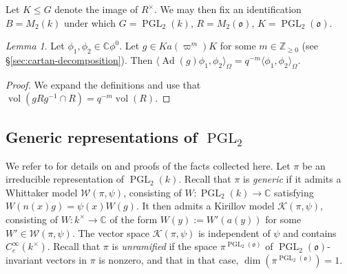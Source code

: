 \documentclass[reqno,10pt]{amsart}
\theoremstyle{plain} %
\theoremstyle{definition}
\theoremstyle{plain} %
\theoremstyle{remark}
\theoremstyle{itplain} %
\newtheorem{lemma}{Lemma}
\theoremstyle{remark} %
\renewcommand{\geq}{\geqslant}
\renewcommand{\leq}{\leqslant}
\numberwithin{equation}{section}
\DeclareMathOperator{\Ad}{Ad}
\def\PGL{\operatorname{PGL}}
\DeclareMathOperator{\vol}{vol}
\begin{document}
Let $K \leq G$ denote the image of $R^\times$.  We may then fix an identification $B = M_2(k)$ under which $G = \PGL_2(k)$, $R = M_2(\mathfrak{o})$, $K = \PGL_2(\mathfrak{o})$.
\begin{lemma}\label{lem:formula-for-how-Ad-acts-on-distinguish-element-inner-products}
  Let $\phi_1, \phi_2 \in \mathbb{C} \phi^0$.  Let $g \in K a(\varpi^m) K$ for some $m \in \mathbb{Z}_{\geq 0}$ (see \S\ref{sec:cartan-decomposition}).  Then $\langle \Ad(g) \phi_1, \phi_2 \rangle_{\Omega} = q^{-m} \langle \phi_1, \phi_2 \rangle_{\Omega}$.
\end{lemma}
\begin{proof}
  We expand the definitions and use that $\vol(g R g^{-1} \cap R) = q^{-m} \vol(R)$.
\end{proof}


\subsection{Generic representations of
  $\operatorname{PGL}_2$}\label{sec-2-3}
We refer to \cite[\S4.4, \S4.6]{MR1431508} for details on and proofs of the facts collected here.  Let $\pi$ be an irreducible representation of $\PGL_2(k)$.  Recall that $\pi$ is \emph{generic} if it admits a Whittaker model $\mathcal{W}(\pi,\psi)$, consisting of $W : \PGL_2(k) \rightarrow \mathbb{C}$ satisfying $W(n(x) g) = \psi(x) W(g)$.  It then admits a Kirillov model $\mathcal{K}(\pi,\psi)$, consisting of $W : k^\times \rightarrow \mathbb{C}$ of the form $W(y) := W'(a(y))$ for some $W' \in \mathcal{W}(\pi,\psi)$.  The vector space $\mathcal{K}(\pi,\psi)$ is independent of $\psi$ and contains $C_c^\infty(k^\times)$.  Recall that $\pi$ is \emph{unramified} if the space $\pi^{\PGL_2(\mathfrak{o})}$ of $\PGL_2(\mathfrak{o})$-invariant vectors in $\pi$ is nonzero, and that in that case, $\dim(\pi^{\PGL_2(\mathfrak{o})}) = 1$.
\end{document}
